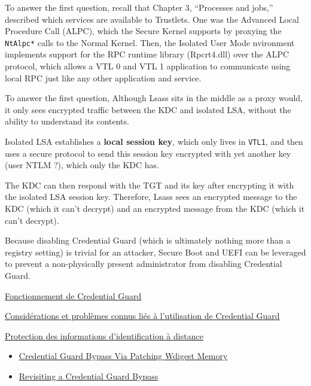 To answer the first question, recall that Chapter 3, “Processes and jobs,” described which services are available to Trustlets. One was the Advanced Local Procedure Call (ALPC), which the Secure Kernel supports by proxying the \verb+NtAlpc*+ calls to the Normal Kernel. Then, the Isolated User Mode nvironment implements support for the RPC runtime library (Rpcrt4.dll) over the ALPC protocol, which allows a VTL 0 and VTL 1 application to communicate using local RPC just like any other application and service.


To answer the first question, Although Lsass sits in the middle as a proxy would, it only
sees encrypted traffic between the KDC and isolated LSA, without the ability to understand its contents.

Isolated LSA establishes a {\bf local session key}, which only lives in \verb+VTL1+, and then uses a secure protocol to send this session key encrypted with yet another key (user NTLM ?), which only the KDC has.

The KDC can then respond with the TGT and its key after encrypting it with the isolated LSA session key. Therefore, Lsass sees an encrypted message to the KDC (which it can’t decrypt) and an encrypted message from the KDC (which it can’t decrypt).


Because disabling Credential Guard (which is ultimately nothing more than a registry setting) is trivial for an attacker, Secure Boot and UEFI can be leveraged to prevent a non-physically present administrator from disabling Credential Guard.



\href{https://learn.microsoft.com/fr-fr/windows/security/identity-protection/credential-guard/how-it-works}{Fonctionnement de Credential Guard}

\href{https://learn.microsoft.com/fr-fr/windows/security/identity-protection/credential-guard/considerations-known-issues}{Considérations et problèmes connus liés à l’utilisation de Credential Guard}


\href{https://learn.microsoft.com/fr-fr/windows/security/identity-protection/remote-credential-guard?tabs=intune}{Protection des informations d’identification à distance}
\begin{itemize}
    \item \href{https://github.com/wh0amitz/BypassCredGuard}{Credential Guard Bypass Via Patching Wdigest Memory}
    \item \href{https://itm4n.github.io/credential-guard-bypass/}{Revisiting a Credential Guard Bypass}
\end{itemize}

